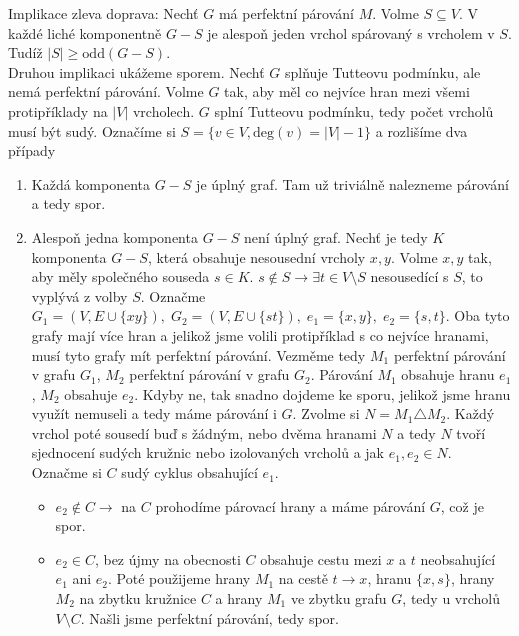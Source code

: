 \begin{t_proof}
  Implikace zleva doprava: Nechť $G$ má perfektní párování $M$. Volme $S \subseteq V$. V každé liché komponentně $G-S$ je alespoň jeden vrchol spárovaný s vrcholem v $S$. Tudíž $|S| \geq \mathrm{odd}(G-S)$. \\
  Druhou implikaci ukážeme sporem. Nechť $G$ splňuje Tutteovu podmínku, ale nemá perfektní párování. Volme $G$ tak, aby měl co nejvíce hran mezi všemi protipříklady na $|V|$ vrcholech. $G$ splní Tutteovu podmínku, tedy počet vrcholů musí být sudý. Označíme si $S = \{v \in V, \mathrm{deg}(v) = |V| - 1 \}$ a rozlišíme dva případy
  \begin{enumerate}
    \item Každá komponenta $G-S$ je úplný graf. Tam už triviálně nalezneme párování a tedy spor.
	\item Alespoň jedna komponenta $G-S$ není úplný graf. Nechť je tedy $K$ komponenta $G-S$, která obsahuje nesousední vrcholy $x,y$. Volme $x,y$ tak, aby měly společného souseda $s \in K$. $s \not\in S \rightarrow \exists t \in V \setminus S$ nesousedící s $S$, to vyplývá z volby $S$. Označme $G_1 = (V, E \cup \{xy\}), \; G_2 = (V, E \cup \{st\}), \; e_1 = \{x,y\}, \; e_2 = \{s,t\}$. Oba tyto grafy mají více hran a jelikož jsme volili protipříklad s co nejvíce hranami, musí tyto grafy mít perfektní párování. Vezměme tedy $M_1$ perfektní párování v grafu $G_1$, $M_2$ perfektní párování v grafu $G_2$. Párování $M_1$ obsahuje hranu $e_1$, $M_2$ obsahuje $e_2$. Kdyby ne, tak snadno dojdeme ke sporu, jelikož jsme hranu využít nemuseli a tedy máme párování i $G$. Zvolme si $N = M_1 \triangle M_2$. Každý vrchol poté sousedí buď s žádným, nebo dvěma hranami $N$ a tedy $N$ tvoří sjednocení sudých kružnic nebo izolovaných vrcholů a jak $e_1, e_2 \in N$. Označme si $C$ sudý cyklus obsahující $e_1$.
	\begin{itemize}
      \item $e_2 \not\in C \rightarrow$ na $C$ prohodíme párovací hrany a máme párování $G$, což je spor.
	  \item $e_2 \in C$, bez újmy na obecnosti $C$ obsahuje cestu mezi $x$ a $t$ neobsahující $e_1$ ani $e_2$. Poté použijeme hrany $M_1$ na cestě $t\rightarrow x$, hranu $\{x,s\}$, hrany $M_2$ na zbytku kružnice $C$ a hrany $M_1$ ve zbytku grafu $G$, tedy u vrcholů $V \setminus C$. Našli jsme perfektní párování, tedy spor.
	\end{itemize}
  \end{enumerate}
\end{t_proof}

